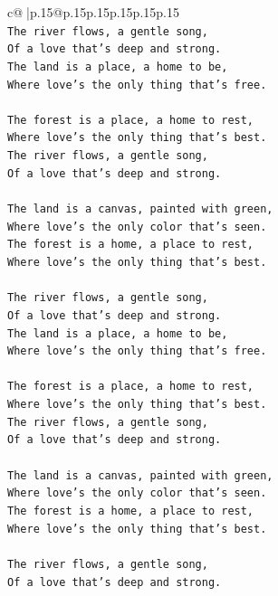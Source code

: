 \documentclass{article}
\begin{document}
{\begin{supertabular}{c@{$\;$}|p{.15\linewidth}@{}p{.15\linewidth}p{.15\linewidth}p{.15\linewidth}p{.15\linewidth}p{.15\linewidth}}
{{{\\ 
\texttt{The river flows, a gentle song,} \\
\texttt{Of a love that's deep and strong.} \\
\texttt{The land is a place, a home to be,} \\
\texttt{Where love's the only thing that's free.} \\
\\ 
\texttt{The forest is a place, a home to rest,} \\
\texttt{Where love's the only thing that's best.} \\
\texttt{The river flows, a gentle song,} \\
\texttt{Of a love that's deep and strong.} \\
\\ 
\texttt{The land is a canvas, painted with green,} \\
\texttt{Where love's the only color that's seen.} \\
\texttt{The forest is a home, a place to rest,} \\
\texttt{Where love's the only thing that's best.} \\
\\ 
\texttt{The river flows, a gentle song,} \\
\texttt{Of a love that's deep and strong.} \\
\texttt{The land is a place, a home to be,} \\
\texttt{Where love's the only thing that's free.} \\
\\ 
\texttt{The forest is a place, a home to rest,} \\
\texttt{Where love's the only thing that's best.} \\
\texttt{The river flows, a gentle song,} \\
\texttt{Of a love that's deep and strong.} \\
\\ 
\texttt{The land is a canvas, painted with green,} \\
\texttt{Where love's the only color that's seen.} \\
\texttt{The forest is a home, a place to rest,} \\
\texttt{Where love's the only thing that's best.} \\
\\ 
\texttt{The river flows, a gentle song,} \\
\texttt{Of a love that's deep and strong.} \\
}}}
\end{supertabular}}
\end{document}
